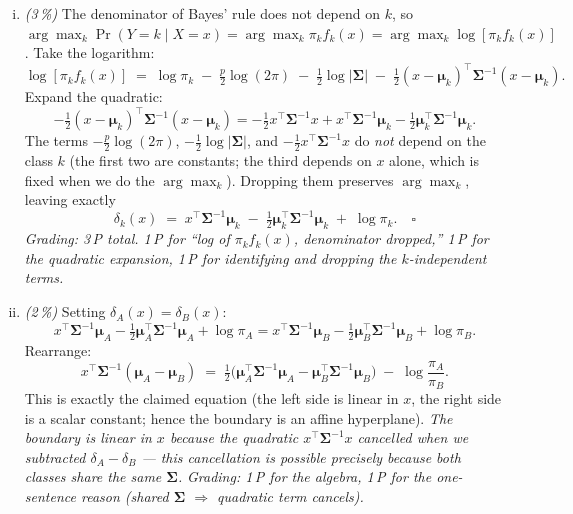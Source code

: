 \documentclass[11pt,a4paper]{article}
\newcommand{\subpoints}[1]{\textit{(#1\,\%)}}
\begin{document}
\begin{enumerate}[(i)]
  \item \subpoints{3} The denominator of Bayes' rule does not depend on $k$, so $\arg\max_k
        \Pr(Y = k \mid X = x) = \arg\max_k \pi_k f_k(x) = \arg\max_k \log[\pi_k f_k(x)]$.
        Take the logarithm:
        $$\log[\pi_k f_k(x)] \;=\; \log \pi_k \;-\; \tfrac{p}{2}\log(2\pi) \;-\; \tfrac{1}{2}\log|\boldsymbol\Sigma|
                                \;-\; \tfrac{1}{2}(x - \boldsymbol\mu_k)^\top \boldsymbol\Sigma^{-1}(x - \boldsymbol\mu_k).$$
        Expand the quadratic:
        $$-\tfrac{1}{2}(x - \boldsymbol\mu_k)^\top \boldsymbol\Sigma^{-1}(x - \boldsymbol\mu_k)
          = -\tfrac{1}{2} x^\top \boldsymbol\Sigma^{-1} x
            + x^\top \boldsymbol\Sigma^{-1} \boldsymbol\mu_k
            - \tfrac{1}{2}\boldsymbol\mu_k^\top \boldsymbol\Sigma^{-1} \boldsymbol\mu_k.$$
        The terms $-\tfrac{p}{2}\log(2\pi)$, $-\tfrac{1}{2}\log|\boldsymbol\Sigma|$, and
        $-\tfrac{1}{2}x^\top \boldsymbol\Sigma^{-1} x$ do \emph{not} depend on the class $k$
        (the first two are constants; the third depends on $x$ alone, which is fixed when we
        do the $\arg\max_k$). Dropping them preserves $\arg\max_k$, leaving exactly
        $$\delta_k(x) \;=\; x^\top \boldsymbol\Sigma^{-1} \boldsymbol\mu_k
                          \;-\; \tfrac{1}{2}\boldsymbol\mu_k^\top \boldsymbol\Sigma^{-1} \boldsymbol\mu_k
                          \;+\; \log \pi_k. \quad\square$$
        \emph{Grading: 3\,P total. 1\,P for ``log of $\pi_k f_k(x)$, denominator dropped,'' 1\,P for
        the quadratic expansion, 1\,P for identifying and dropping the $k$-independent terms.}

  \item \subpoints{2} Setting $\delta_A(x) = \delta_B(x)$:
        $$x^\top \boldsymbol\Sigma^{-1} \boldsymbol\mu_A - \tfrac{1}{2}\boldsymbol\mu_A^\top \boldsymbol\Sigma^{-1} \boldsymbol\mu_A + \log \pi_A
          = x^\top \boldsymbol\Sigma^{-1} \boldsymbol\mu_B - \tfrac{1}{2}\boldsymbol\mu_B^\top \boldsymbol\Sigma^{-1} \boldsymbol\mu_B + \log \pi_B.$$
        Rearrange:
        $$x^\top \boldsymbol\Sigma^{-1} (\boldsymbol\mu_A - \boldsymbol\mu_B)
          \;=\; \tfrac{1}{2}\bigl(\boldsymbol\mu_A^\top \boldsymbol\Sigma^{-1} \boldsymbol\mu_A
                                    - \boldsymbol\mu_B^\top \boldsymbol\Sigma^{-1} \boldsymbol\mu_B\bigr)
                \;-\; \log\frac{\pi_A}{\pi_B}.$$
        This is exactly the claimed equation (the left side is linear in $x$, the right side is
        a scalar constant; hence the boundary is an affine hyperplane). \emph{The boundary is
        linear in $x$ because the quadratic $x^\top \boldsymbol\Sigma^{-1} x$ cancelled when we
        subtracted $\delta_A - \delta_B$ --- this cancellation is possible precisely because both
        classes share the same $\boldsymbol\Sigma$.}
        \emph{Grading: 1\,P for the algebra, 1\,P for the one-sentence reason (shared $\boldsymbol\Sigma$
        $\Rightarrow$ quadratic term cancels).}


\end{enumerate}
\end{document}
